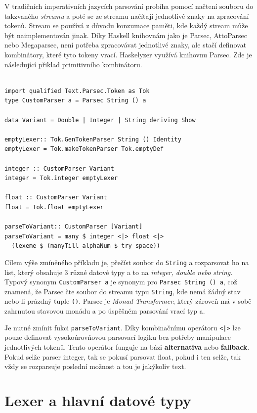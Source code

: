 \documentclass[male,czech]{kithesis}
\newcommand{\haskellInline}[1]{\colorbox{gray!10}{\texttt{#1}}}
\begin{document}
V tradičních imperativních jazycích parsování probíha pomocí načtení souboru 
do takzvaného \textit{streamu} a 
poté se ze streamu načítají jednotlivé znaky na zpracování tokenů. 
Stream se používá z důvodu konzumace paměti, 
kde každý stream může být naimplementován jinak.
Díky Haskell knihovnám jako je Parsec, 
AttoParsec nebo Megaparsec,
není potřeba zpracovávat jednotlivé znaky, 
ale stačí definovat kombinátory, 
které tyto tokeny vrací. 
Haskelyzer využívá knihovnu Parsec. 
Zde je následující přiklad primitivního kombinátoru.

\begin{verbatim}

import qualified Text.Parsec.Token as Tok
type CustomParser a = Parsec String () a

data Variant = Double | Integer | String deriving Show

emptyLexer:: Tok.GenTokenParser String () Identity
emptyLexer = Tok.makeTokenParser Tok.emptyDef

integer :: CustomParser Variant 
integer = Tok.integer emptyLexer 

float :: CustomParser Variant 
float = Tok.float emptyLexer 

parseToVariant:: CustomParser [Variant]
parseToVariant = many $ integer <|> float <|> 
  (lexeme $ (manyTill alphaNum $ try space))

\end{verbatim}

Cílem výše zmíněného příkladu je, 
přečíst soubor do \haskellInline{String} 
a rozparsovat ho na list, 
který obsahuje 3 různé datové typy 
a to na \textit{integer, double nebo string}.
Typový synonym \haskellInline{CustomParser a} 
je synonym pro \haskellInline{Parsec String () a},
což znamená, 
že Parsec čte soubor do streamu typu \haskellInline{String}, 
kde nemá žádný stav nebo-li prázdný tuple \haskellInline{()}. 
Parsec je \textit{Monad Transformer},
který zároveň má v sobě zahrnutou stavovou monádu a 
po úspěšném parsování vrací typ a. 

Je nutné zmínit fukci \haskellInline{parseToVariant}. 
Díky kombinačnímu operátoru \haskellInline{<|>} 
lze pouze definovat vysokoúrovňovou parsovací logiku bez potřeby manipulace jednotlivých tokenů. 
Tento operátor funguje na bázi \textbf{alternativa} nebo
\textbf{fallback}. 
Pokud selže parser integer, 
tak se pokusí parsovat float, 
pokud i ten selže, 
tak vždy se rozparsuje poslední možnost a 
tou je jakýkoliv text.

\section{Lexer a hlavní datové typy}
\end{document}
